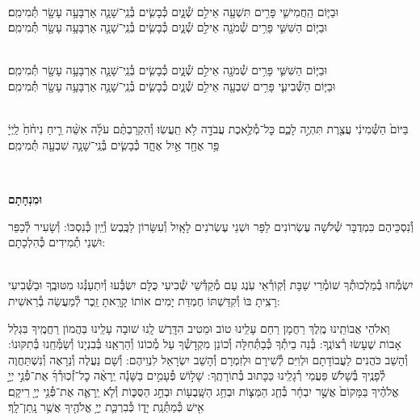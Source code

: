 \documentclass[twoside, openany, parskip=half, 11pt]{book}
\begin{document}
 \\
וּבַיּ֧וֹם הַֽחֲמִישִׁ֛י פָּרִ֥ים תִּשְׁעָ֖ה אֵילִ֣ם שְׁ֯נָ֑יִם כְּ֯בָשִׂ֧ים בְּ֯נֵֽי־שָׁנָ֛ה אַרְבָּעָ֥ה עָשָׂ֖ר תְּ֯מִימִֽם׃
\\
וּבַיּ֧וֹם הַשִּׁשִּׁ֛י פָּרִ֥ים שְׁ֯מֹנָ֖ה אֵילִ֣ם שְׁ֯נָ֑יִם כְּ֯בָשִׂ֧ים בְּ֯נֵֽי־שָׁנָ֛ה אַרְבָּעָ֥ה עָשָׂ֖ר תְּ֯מִימִֽם׃



 \\
וּבַיּ֧וֹם הַשִּׁשִּׁ֛י פָּרִ֥ים שְׁ֯מֹנָ֖ה אֵילִ֣ם שְׁ֯נָ֑יִם כְּ֯בָשִׂ֧ים בְּ֯נֵֽי־שָׁנָ֛ה אַרְבָּעָ֥ה עָשָׂ֖ר תְּ֯מִימִֽם׃
\\
וּבַיּ֧וֹם הַשְּׁ֯בִיעִ֛י פָּרִ֥ים שִׁבְעָ֖ה אֵילִ֣ם שְׁ֯נָ֑יִם כְּ֯בָשִׂ֧ים בְּ֯נֵֽי־שָׁנָ֛ה אַרְבָּעָ֥ה עָשָׂ֖ר תְּ֯מִימִֽם׃



\\
בַּיּוֹם֙ הַשְּׁ֯מִינִ֔י עֲצֶ֖רֶת תִּהְיֶ֣ה לָכֶ֑ם כׇּל־מְ֯לֶ֥אכֶת עֲבֹדָ֖ה לֹ֥א תַֽעֲשֽׂוּ׃ וְ֯הִקְרַבְתֶּ֨ם עֹלָ֜ה אִשֵּׁ֨ה רֵ֤יחַ נִיחֹ֨חַ֙ לַֽיְיָ֔ פַּ֥ר אֶחָ֖ד אַ֣יִל אֶחָ֑ד כְּ֯בָשִׂ֧ים בְּ֯נֵֽי־שָׁנָ֛ה שִׁבְעָ֖ה תְּ֯מִימִֽם׃

\\ \label{uminchasam}
\begin{Large}\textbf{וּמִנְחָתָם}\end{Large}
וְ֯נִסְכֵּיהֶם כִּמְדֻבָּר שְׁ֯לֹשָׁה עֶשְׂרוֹנִים לַפָּר וּשְׁנֵי עֶשְׂרֹנִים לָאָֽיִל וְ֯עִשָּׂרוֹן לַכֶּֽבֶשׂ וְ֯יַֽיִן כְּ֯נִסְכּוֹ: וְ֯שָׂעִיר לְ֯כַפֵּר וּשְׁנֵי תְ֯מִידִים כְּ֯הִלְכָתָם:

\begin{sometimes}

\shabbos\\
יִשְׂמְ֯חוּ בְ֯מַלְכוּתְ֯ךָ שׁוֹמְ֯רֵי שַׁבָּת וְ֯קֽוֹרְ֯אֵי עֹֽנֶג עַם מְ֯קַדְּ֯שֵׁי שְׁ֯בִיעִי כֻּלָּם יִשְׂבְּ֯עוּ וְ֯יִתְעַנְּ֯גוּ מִטּוּבֶֽךָ וּבַשְּׁ֯בִיעִי רָצִֽיתָ בּוֹ וְ֯קִדַּשְׁתּוֹ חֶמְדַּת יָמִים אוֹתוֹ קָרָֽאתָ זֵֽכֶר לְ֯מַעֲשֵׂה בְ֯רֵאשִׁית:

\end{sometimes}

\enlargethispage{\baselineskip}
וֵאלֹהֵי אֲבוֹתֵֽינוּ מֶֽלֶךְ רַחֲמָן רַחֵם עָלֵֽינוּ טוֹב וּמֵטִיב הִדָּֽרֶשׁ לָֽנוּ שׁוּבָה עָלֵֽינוּ בַּהֲמוֹן רַחֲמֶֽיךָ בִּגְלַל אָבוֹת שֶׁעָשׂוּ רְ֯צוֹנֶֽךָ: בְּ֯נֵה בֵיתְ֯ךָ כְּ֯בַתְּ֯חִלָּה וְ֯כוֹנֵן מִקְדָשְׁ֯ךָ עַל מְ֯כוֹנוֹ וְ֯הַרְאֵֽנוּ בְּ֯בִנְיָנוֹ וְ֯שַׂמְּ֯חֵֽנוּ בְּ֯תִקּוּנוֹ: וְ֯הָשֵׁב כֹּהֲנִים לַעֲבוֹדָתָם וּלְוִיִּם לְ֯שִׁירָם וּלְזִמְרָם וְ֯הָשֵׁב יִשְׂרָאֵל לִנְוֵיהֶם: וְ֯שָׁם נַעֲלֶה וְ֯נֵרָאֶה וְ֯נִשְׁתַּחֲוֶה לְ֯פָנֶֽיךָ בְּ֯שָׁלֹֹשׁ פַּעֲמֵי רְ֯גָלֵֽינוּ כַּכָּתוּב בְּ֯תוֹרָתֶֽךָ: שָׁל֣וֹשׁ פְּ֯עָמִ֣ים בַּשָּׁנָ֡ה יֵֽרָאֶ֨ה כׇל־זְ֯כֽוּרְ֯ךָ֜ אֶת־פְּ֯נֵ֣י יְיָ֣ אֱלֹהֶ֗יךָ בַּמָּקוֹם֙ אֲשֶׁ֣ר יִבְחָ֔ר בְּ֯חַ֧ג הַמַּצּ֛וֹת וּבְחַ֥ג הַשָּֽׁבֻע֖וֹת וּבְחַ֣ג הַסֻּכּ֑וֹת וְ֯לֹ֧א יֵֽרָאֶ֛ה אֶת־פְּ֯נֵ֥י יְיָ֖ רֵיקָֽם׃ אִ֖ישׁ כְּ֯מַתְּ֯נַֽת יָד֑וֹ כְּ֯בִרְכַּ֛ת יְיָ֥ אֱלֹהֶ֖יךָ אֲשֶׁ֥ר נָֽתַן־לָֽךְ׃
\end{document}
